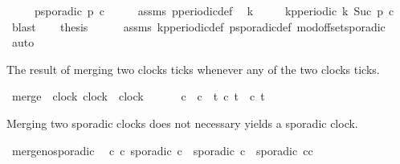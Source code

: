 \begin{isabellebody}
\ \ \ \ \ {\isacartoucheopen}p{\isacharunderscore}sporadic\ p\ c{\isacartoucheclose}\isanewline
%
\isadelimproof
%
\endisadelimproof
%
\isatagproof
{}\isamarkupfalse%
\ {\isacharminus}\isanewline
\ \ \isamarkupfalse%
\ assms\ p{\isacharunderscore}periodic{\isacharunderscore}def\ \isamarkupfalse%
\ k\isanewline
\ \ \ \ \ {\isacartoucheopen}kp{\isacharunderscore}periodic\ k\ {\isacharparenleft}Suc\ p{\isacharparenright}\ c{\isacartoucheclose}\ \isamarkupfalse%
\ blast\isanewline
\ \ \isamarkupfalse%
\ {\isacharquery}thesis\isanewline
\ \ \ \ \isamarkupfalse%
\ assms\ kp{\isacharunderscore}periodic{\isacharunderscore}def\ p{\isacharunderscore}sporadic{\isacharunderscore}def\ mod{\isacharunderscore}offset{\isacharunderscore}sporadic\ \isamarkupfalse%
\ auto\isanewline
{}\isamarkupfalse%
%
\endisatagproof
{\isafoldproof}%
%
\isadelimproof
%
\endisadelimproof
%
\isadelimdocument
%
\endisadelimdocument
%
\isatagdocument
%
\isamarkuptrue%
%
\endisatagdocument
{\isafolddocument}%
%
\isadelimdocument
%
\endisadelimdocument
%
\begin{isamarkuptext}%
The result of merging two clocks ticks whenever any of the two clocks ticks.%
\end{isamarkuptext}\isamarkuptrue%
\isamarkupfalse%
\ merge\ {\isacharcolon}{\isacharcolon}\ {\isacartoucheopen}{\isacharbrackleft}clock{\isacharcomma}\ clock{\isacharbrackright}\ {\isasymRightarrow}\ clock{\isacartoucheclose}\ {\isacharparenleft}\ {\isacartoucheopen}{\isasymoplus}{\isacartoucheclose}\ {}{}{\isacharparenright}\isanewline
\ \ \ {\isacartoucheopen}c{}\ {\isasymoplus}\ c{}\ {\isasymequiv}\ {\isasymlambda}t{\isachardot}\ c{}\ t\ {\isasymor}\ c{}\ t{\isacartoucheclose}%
\begin{isamarkuptext}%
Merging two sporadic clocks does not necessary yields a sporadic clock.%
\end{isamarkuptext}\isamarkuptrue%
\isamarkupfalse%
\ merge{\isacharunderscore}no{\isacharunderscore}sporadic{\isacharcolon}\isanewline
\ \ {\isacartoucheopen}{\isasymexists}c\ c{\isacharprime}{\isachardot}\ sporadic\ c\ {\isasymand}\ sporadic\ c{\isacharprime}\ {\isasymand}\ {\isasymnot}sporadic\ {\isacharparenleft}c{\isasymoplus}c{\isacharprime}{\isacharparenright}{\isacartoucheclose}\isanewline

\end{isabellebody}
